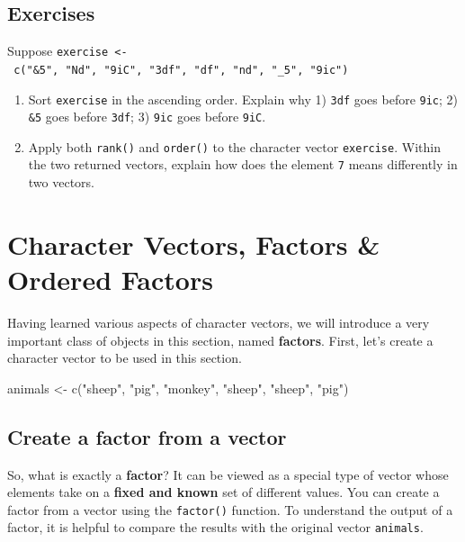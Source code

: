 \documentclass[
]{book}
\newenvironment{Shaded}{\begin{snugshade}}{\end{snugshade}}
\newcommand{\FunctionTok}[1]{\textcolor[rgb]{0.00,0.00,0.00}{#1}}
\newcommand{\NormalTok}[1]{#1}
\newcommand{\OtherTok}[1]{\textcolor[rgb]{0.56,0.35,0.01}{#1}}
\newcommand{\StringTok}[1]{\textcolor[rgb]{0.31,0.60,0.02}{#1}}
\begin{document}
\hypertarget{exercises-12}{%
\subsection{Exercises}\label{exercises-12}}

Suppose \texttt{exercise\ \textless{}-\ c("\&5",\ "Nd",\ "9iC",\ "3df",\ "df",\ "nd",\ "\_5",\ "9ic")}

\begin{enumerate}
\def\labelenumi{\arabic{enumi}.}
\item
  Sort \texttt{exercise} in the ascending order. Explain why 1) \texttt{3df} goes before \texttt{9ic}; 2) \texttt{\&5} goes before \texttt{3df}; 3) \texttt{9ic} goes before \texttt{9iC}.
\item
  Apply both \texttt{rank()} and \texttt{order()} to the character vector \texttt{exercise}. Within the two returned vectors, explain how does the element \texttt{7} means differently in two vectors.
\end{enumerate}

\hypertarget{factors}{%
\section{Character Vectors, Factors \& Ordered Factors}\label{factors}}

Having learned various aspects of character vectors, we will introduce a very important class of objects in this section, named \textbf{factors}. First, let's create a character vector to be used in this section.

\begin{Shaded}
\begin{Highlighting}[]
\NormalTok{animals }\OtherTok{\textless{}{-}} \FunctionTok{c}\NormalTok{(}\StringTok{"sheep"}\NormalTok{, }\StringTok{"pig"}\NormalTok{, }\StringTok{"monkey"}\NormalTok{, }\StringTok{"sheep"}\NormalTok{, }\StringTok{"sheep"}\NormalTok{, }\StringTok{"pig"}\NormalTok{)}
\end{Highlighting}
\end{Shaded}

\hypertarget{create-a-factor-from-a-vector}{%
\subsection{Create a factor from a vector}\label{create-a-factor-from-a-vector}}

So, what is exactly a \textbf{factor}? It can be viewed as a special type of vector whose elements take on a \textbf{fixed and known} set of different values. You can create a factor from a vector using the \texttt{factor()} function. To understand the output of a factor, it is helpful to compare the results with the original vector \texttt{animals}.
\end{document}
